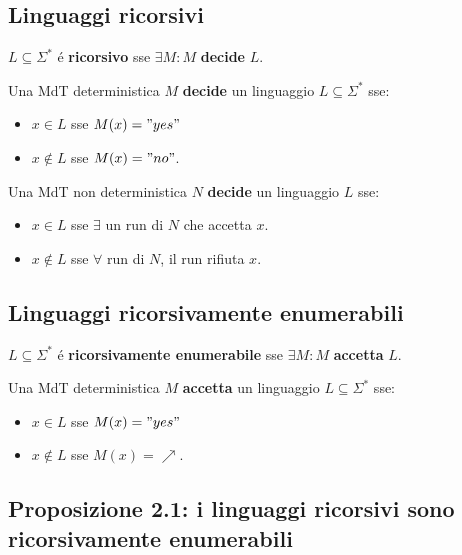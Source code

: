 \subsection{Linguaggi ricorsivi}
$L \subseteq \Sigma^*$ é \textbf{ricorsivo} sse $\exists M : M$ \textbf{decide} $L$.

Una MdT deterministica $M$ \textbf{decide} un linguaggio $L \subseteq \Sigma^*$ sse:
\begin{itemize}
	\item $x \in L$ sse $M(x) = "yes"$
	\item $x \notin L$ sse $M(x) = "no"$.
\end{itemize}

Una MdT non deterministica $N$ \textbf{decide} un linguaggio $L$ sse:
\begin{itemize}
	\item $x \in L$ sse $\exists$ un run di $N$ che accetta $x$.
	\item $x \notin L$ sse $\forall$ run di $N$, il run rifiuta $x$.
\end{itemize}


\subsection{Linguaggi ricorsivamente enumerabili}
$L \subseteq \Sigma^*$ é \textbf{ricorsivamente enumerabile} sse $\exists M : M$ \textbf{accetta} $L$.

Una MdT deterministica $M$ \textbf{accetta} un linguaggio $L \subseteq \Sigma^*$ sse:
\begin{itemize}
	\item $x \in L$ sse $M(x) = "yes"$
	\item $x \notin L$ sse $M(x) = \nearrow$.
\end{itemize}


\subsection{Proposizione 2.1: i linguaggi ricorsivi sono ricorsivamente enumerabili}


